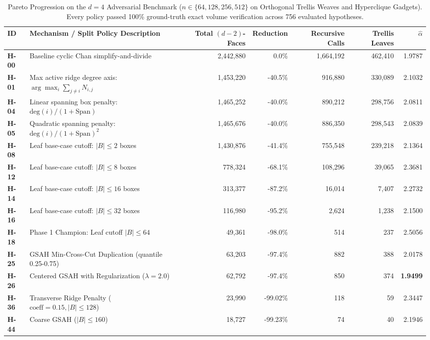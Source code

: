 \begin{table}[t]
\centering
\caption{Pareto Progression on the $d=4$ Adversarial Benchmark ($n \in \{64, 128, 256, 512\}$ on Orthogonal Trellis Weaves and Hyperclique Gadgets). Every policy passed 100\% ground-truth exact volume verification across 756 evaluated hypotheses.}
\label{tab:leaderboard}
\small
\begin{tabular}{llrrrrr}
\toprule
\textbf{ID} & \textbf{Mechanism / Split Policy Description} & \textbf{Total $(d-2)$-Faces} & \textbf{Reduction} & \textbf{Recursive Calls} & \textbf{Trellis Leaves} & $\hat{\alpha}$ \\
\midrule
\textbf{H-00} & Baseline cyclic Chan simplify-and-divide & 2,442,880 & 0.0\% & 1,664,192 & 462,410 & 1.9787 \\
\textbf{H-01} & Max active ridge degree axis: $\arg\max_i \sum_{j \ne i} N_{i,j}$ & 1,453,220 & -40.5\% & 916,880 & 330,089 & 2.1032 \\
\textbf{H-04} & Linear spanning box penalty: $\mathrm{deg}(i) / (1 + \text{Span})$ & 1,465,252 & -40.0\% & 890,212 & 298,756 & 2.0811 \\
\textbf{H-05} & Quadratic spanning penalty: $\mathrm{deg}(i) / (1 + \text{Span})^2$ & 1,465,676 & -40.0\% & 886,350 & 298,543 & 2.0839 \\
\textbf{H-08} & Leaf base-case cutoff: $|B| \le 2$ boxes & 1,430,876 & -41.4\% & 755,548 & 239,218 & 2.1364 \\
\textbf{H-12} & Leaf base-case cutoff: $|B| \le 8$ boxes & 778,324 & -68.1\% & 108,296 & 39,065 & 2.3681 \\
\textbf{H-14} & Leaf base-case cutoff: $|B| \le 16$ boxes & 313,377 & -87.2\% & 16,014 & 7,407 & 2.2732 \\
\textbf{H-16} & Leaf base-case cutoff: $|B| \le 32$ boxes & 116,980 & -95.2\% & 2,624 & 1,238 & 2.1500 \\
\textbf{H-18} & Phase 1 Champion: Leaf cutoff $|B| \le 64$ & 49,361 & -98.0\% & 514 & 237 & 2.5056 \\
\textbf{H-25} & GSAH Min-Cross-Cut Duplication (quantile 0.25-0.75) & 63,203 & -97.4\% & 882 & 388 & 2.0178 \\
\textbf{H-26} & Centered GSAH with Regularization ($\lambda = 2.0$) & 62,792 & -97.4\% & 850 & 374 & \textbf{1.9499} \\
\textbf{H-36} & Transverse Ridge Penalty ($\mathrm{coeff} = 0.15, |B| \le 128$) & 23,990 & -99.02\% & 118 & 59 & 2.3447 \\
\textbf{H-44} & Coarse GSAH ($|B| \le 160$) & 18,727 & -99.23\% & 74 & 40 & 2.1946 \\

\end{tabular}
\end{table}
